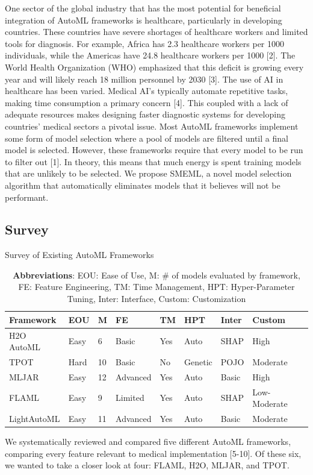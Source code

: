 \documentclass{article}
\begin{document}
One sector of the global industry that has the most potential for beneficial integration of AutoML frameworks is healthcare, particularly in developing countries. These countries have severe shortages of healthcare workers and limited tools for diagnosis. For example, Africa has 2.3 healthcare workers per 1000 individuals, while the Americas have 24.8 healthcare workers per 1000 [2]. The World Health Organization (WHO) emphasized that this deficit is growing every year and will likely reach 18 million personnel by 2030 [3]. The use of AI in healthcare has been varied. Medical AI's typically automate repetitive tasks, making time consumption a primary concern [4]. This coupled with a lack of adequate resources makes designing faster diagnostic systems for developing countries' medical sectors a pivotal issue. 
%
Most AutoML frameworks implement some form of model selection where a pool of models are filtered until a final model is selected. However, these frameworks require that every model to be run to filter out [1]. In theory, this means that much energy is spent training models that are unlikely to be selected. We propose SMEML, a novel model selection algorithm that automatically eliminates models that it believes will not be performant. 

\subsection{Survey}

\begin{table}
  \caption{Survey of Existing AutoML Frameworks}
  \label{automl-survey}
  \centering
  \begin{tabular}{lllllllll}
    \toprule
    Framework & EOU & M & FE & TM & HPT & Inter & Custom\\
    \midrule
    H2O AutoML & Easy & 6 & Basic & Yes & Auto & SHAP & High\\
    TPOT & Hard & 10 & Basic & No & Genetic & POJO & Moderate\\
    MLJAR & Easy & 12 & Advanced & Yes & Auto & Basic & High\\
    FLAML & Easy & 9 & Limited & Yes & Auto & SHAP & Low-Moderate\\
    LightAutoML & Easy & 11 & Advanced & Yes & Auto & Basic & Moderate\\
    \bottomrule
  \end{tabular}
  \captionsetup{font=footnotesize}
  \caption*{\textbf{Abbreviations}: EOU: Ease of Use, M: \# of models evaluated by framework, FE: Feature Engineering, TM: Time Management, HPT: Hyper-Parameter Tuning, Inter: Interface, Custom: Customization}
\end{table}
We systematically reviewed and compared five different AutoML frameworks, comparing every feature relevant to medical implementation [5-10]. Of these six, we wanted to take a closer look at four: FLAML, H2O, MLJAR, and TPOT.
\end{document}
